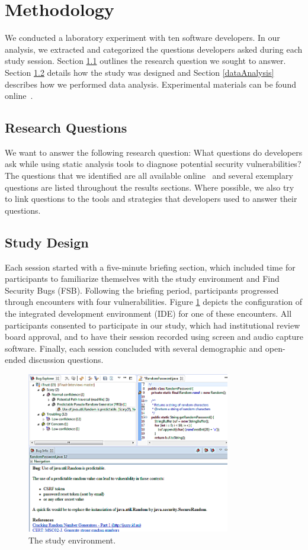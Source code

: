\documentclass{acm_proc_article-sp}
\begin{document}
\section{Methodology}
\label{sec:meth}
We conducted a laboratory experiment with ten software developers. In our analysis, we extracted and categorized the questions developers asked during each study session. 
Section \ref{rqs} outlines the research question we sought to answer. 
Section \ref{studyDesign} details how the study was designed and Section \ref{dataAnalysis} describes how we performed data analysis.
Experimental materials can be found online~\cite{ExperimentalMaterials}.

\subsection{Research Questions}
\label{rqs}
We want to answer the following research question: What questions do developers ask while using static analysis tools to diagnose potential security vulnerabilities? 
The questions that we identified are all available online~\cite{ExperimentalMaterials} and several exemplary questions are listed throughout the results sections.
Where possible, we also try to link questions to the tools and strategies that developers used to answer their questions.




\subsection{Study Design}
\label{studyDesign}
Each session started with a five-minute briefing section, which included time for participants to familiarize themselves with the study environment and Find Security Bugs (FSB).
Following the briefing period, participants progressed through encounters with four vulnerabilities. 
Figure \ref{fig:environment} depicts the configuration of the integrated development environment (IDE) for one of these encounters.
All participants consented to participate in our study, which had institutional review board approval, and to have their session recorded using screen and audio capture software.
Finally, each session concluded with several demographic and open-ended discussion questions.

\begin{figure}
	\centering
	\includegraphics[width=3.5in]{Images/environment.png}
	\caption{The study environment.}
	\label{fig:environment} 
\end{figure}
\end{document}
